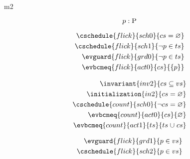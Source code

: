 \documentclass{article}
\begin{document}
\begin{machine}{m2}

\[ \indices{flick}{p : \Pcs} \]

\begin{align}
	\cschedule{flick}{sch0}{ cs = \emptyset } \\
	\cschedule{flick}{sch1}{ \neg p \in ts } \\
	\evguard{flick}{grd0}{ \neg p \in ts } \\
	\evbcmeq{flick}{act0}{cs}{ \{ p \} }
\end{align}






\begin{align}
	\invariant{inv2}{cs \subseteq vs} \\
	\initialization{in2}{ cs = \emptyset } \\
	\cschedule{count}{sch0}{ \neg cs = \emptyset } \\
	\evbcmeq{count}{act0}{cs}{\emptyset} \\
	\evbcmeq{count}{act1}{ts}{ ts \bunion cs }
\end{align}




\begin{align*}
	\evguard{flick}{grd1}{p \in vs} \\
	\cschedule{flick}{sch2}{p \in vs}
\end{align*}

\end{machine}
\end{document}
